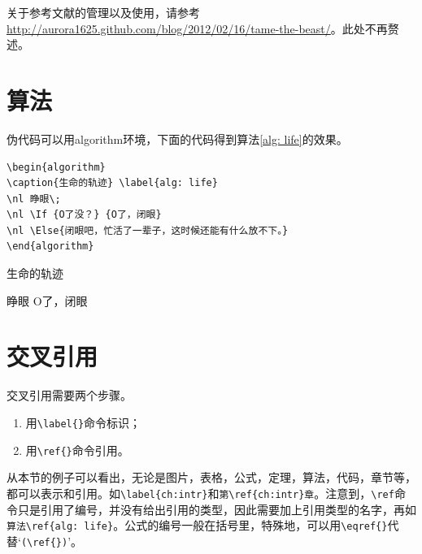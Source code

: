 关于参考文献的管理以及使用，请参考 \url{http://aurora1625.github.com/blog/2012/02/16/tame-the-beast/}。此处不再赘述。


\section{算法}\label{sect:algNcode}
伪代码可以用algorithm环境，下面的代码得到算法\ref{alg: life}的效果。
\begin{verbatim}
\begin{algorithm}
\caption{生命的轨迹} \label{alg: life}
\nl 睁眼\;
\nl \If {O了没？} {O了，闭眼}
\nl \Else{闭眼吧，忙活了一辈子，这时候还能有什么放不下。}
\end{algorithm}
\end{verbatim}
\begin{algorithm}
\caption{生命的轨迹} \label{alg: life}
\nl 睁眼\;
\nl {} {O了，闭眼}
\nl {}
\end{algorithm}
%
\section{交叉引用}\label{sect:ref}
交叉引用需要两个步骤。
\begin{enumerate}
 \item 用\verb|\label{}|命令标识；
 \item 用\verb|\ref{}|命令引用。
\end{enumerate}

从本节的例子可以看出，无论是图片，表格，公式，定理，算法，代码，章节等，都可以表示和引用。如\verb|\label{ch:intr}|和\verb|第\ref{ch:intr}章|。注意到，\verb|\ref|命令只是引用了编号，并没有给出引用的类型，因此需要加上引用类型的名字，再如\verb|算法\ref{alg: life}|。公式的编号一般在括号里，特殊地，可以用\verb|\eqref{}|代替`\verb|(\ref{})|'。



